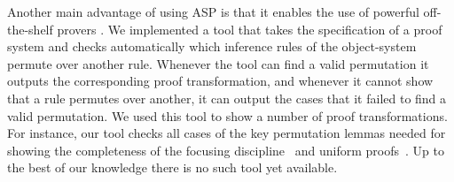 \documentclass{new_tlp}
\begin{document}
% 

Another main advantage of using ASP is that it enables the
use of powerful off-the-shelf
provers \cite{niemela97lpmnr,leone06tcl}. We
implemented a tool that takes the specification of a proof system and
checks automatically which inference rules of the object-system permute
over another rule. 
Whenever the tool can find a valid permutation
it outputs the corresponding proof transformation,
and whenever it cannot show that a rule permutes over another, it can output
the cases that it failed to find a valid permutation. 
We used this tool to show a number of proof
transformations. For instance, our tool checks all cases of the key
permutation lemmas
needed for showing the completeness of the focusing
discipline~\cite{andreoli92jlc} and uniform proofs~\cite{miller91apal}.
Up to the best of our knowledge there is no such tool yet available. 
\end{document}
